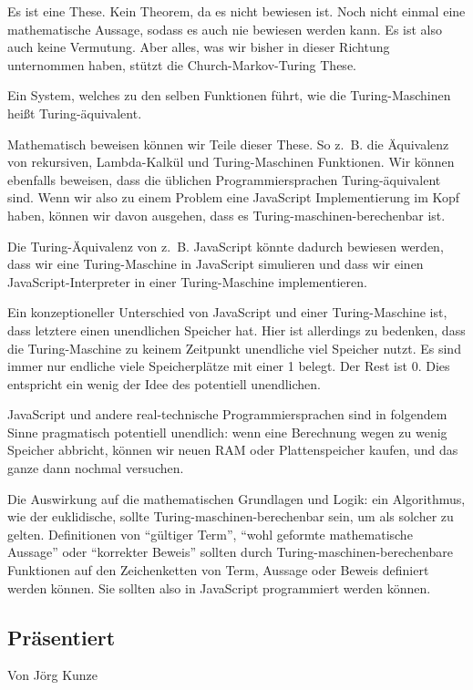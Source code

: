 \documentclass[a4paper]{amsart}
\theoremstyle{definition}
\begin{document}
Es ist eine These. Kein Theorem, da es nicht bewiesen ist. Noch nicht einmal eine mathematische Aussage, sodass es auch nie bewiesen werden kann. Es ist also auch keine Vermutung. Aber alles, was wir bisher in dieser Richtung unternommen haben, stützt die Church-Markov-Turing These.

Ein System, welches zu den selben Funktionen führt, wie die Turing-Maschinen heißt Turing-äquivalent.

Mathematisch beweisen können wir Teile dieser These. So z.~B. die Äquivalenz von rekursiven, Lambda-Kalkül und Turing-Maschinen Funktionen. Wir können ebenfalls beweisen, dass die üblichen Programmiersprachen Turing-äquivalent sind. Wenn wir also zu einem Problem eine JavaScript Implementierung im Kopf haben, können wir davon ausgehen, dass es Turing-maschinen-berechenbar ist.

Die Turing-Äquivalenz von z.~B. JavaScript könnte dadurch bewiesen werden, dass wir eine Turing-Maschine in JavaScript simulieren und dass wir einen JavaScript-Interpreter in einer Turing-Maschine implementieren.

Ein konzeptioneller Unterschied von JavaScript und einer Turing-Maschine ist, dass letztere einen unendlichen Speicher hat. Hier ist allerdings zu bedenken, dass die Turing-Maschine zu keinem Zeitpunkt unendliche viel Speicher nutzt. Es sind immer nur endliche viele Speicherplätze mit einer 1 belegt. Der Rest ist 0. Dies entspricht ein wenig der Idee des potentiell unendlichen.

JavaScript und andere real-technische Programmiersprachen sind in folgendem Sinne pragmatisch potentiell unendlich: wenn eine Berechnung wegen zu wenig Speicher abbricht, können wir neuen RAM oder Plattenspeicher kaufen, und das ganze dann nochmal versuchen. 

Die Auswirkung auf die mathematischen Grundlagen und Logik: ein Algorithmus, wie der euklidische, sollte Turing-maschinen-berechenbar sein, um als solcher zu gelten. Definitionen von "`gültiger Term"', "`wohl geformte mathematische Aussage"' oder "`korrekter Beweis"' sollten durch Turing-maschinen-berechenbare Funktionen auf den Zeichenketten von Term, Aussage oder Beweis definiert werden können. Sie sollten also in JavaScript programmiert werden können.

\subsection*{Präsentiert}
Von Jörg Kunze
\end{document}
